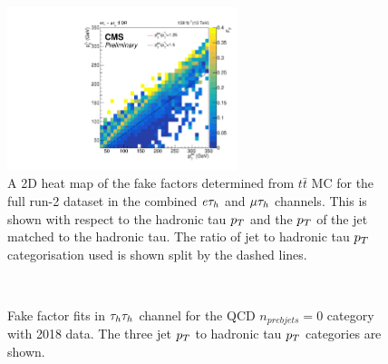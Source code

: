 \begin{figure}[!hbtp]
\centering
    \includegraphics[width=0.6\textwidth]{Figures/ff_colz_ttbar_lt.pdf}
\caption{A 2D heat map of the fake factors determined from $t\bar{t}$ MC for the full run-2 dataset in the combined $e\tau_{h}$ and $\mu\tau_{h}$ channels. This is shown with respect to the hadronic tau $p_{T}$ and the $p_{T}$ of the jet matched to the hadronic tau. The ratio of jet to hadronic tau $p_{T}$ categorisation used is shown split by the dashed lines.}
\label{fig:ff_colz}
\end{figure}

\begin{figure}[!hbtp]
\centering
     \\
\caption{Fake factor fits in $\tau_{h}\tau_{h}$ channel for the QCD $n_{pre b jets}=0$ category with 2018 data. The three jet $p_{T}$ to hadronic tau $p_{T}$ categories are shown.}
\label{fig:tt_ff_fit}
\end{figure}

